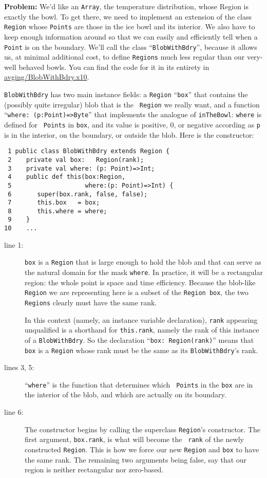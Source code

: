 {\bf Problem:} We'd like an {\tt Array}, the temperature distribution,
whose Region is exactly the bowl.  To get there, we need to implement an
extension of the class {\tt Region} whose {\tt Points} are those in the ice
bowl and its interior. We also have to keep enough information around
so that we can easily and
efficiently tell when a {\tt Point} is on the boundary. We'll call the class
``{\tt BlobWithBdry}'', because it allows us, at minimal additional cost, to
define {\tt Regions} much less regular than our very-well behaved bowls. You
can find the code for it in its entirety in
 \href{http://dist.codehaus.org/x10/documentation/guide/src/avging/BlobWithBdry.x10}
{avging/BlobWithBdry.x10}.
  

{\tt BlobWithBdry} has two main instance fields: a {\tt Region}
``{\tt box}'' that contains the (possibly quite irregular) blob that is the {\tt
Region} we really want, and a function ``{\tt where: (p:Point)=>Byte}'' that
implements the analogue of {\tt inTheBowl}: {\tt where} is defined for {\tt
Points} in {\tt box}, and its value is positive, 0, or
negative according as {\tt p} is in the interior, on the boundary, or outside
the blob.  Here is the constructor:

\begin{verbatim}
 1 public class BlobWithBdry extends Region {
 2    private val box:   Region(rank);
 3    private val where: (p: Point)=>Int;
 4    public def this(box:Region, 
 5                    where:(p: Point)=>Int) {
 6       super(box.rank, false, false);
 7       this.box   = box;
 8       this.where = where;
 9    }
10    ...
\end{verbatim}
\begin{description}
\item[line 1:]  {\tt box} is a {\tt Region} that is large enough to hold the
blob and that can serve as the natural domain for the mask {\tt where}.
In practice, it will be a rectangular region: the whole point is space 
and time efficiency.  Because the blob-like {\tt Region} we are representing
here is a subset of the {\tt Region box}, the two {\tt Regions} clearly must
have the same rank.

In this context (namely, an instance variable declaration), {\tt rank}
appearing unqualified is a shorthand for
{\tt this.rank}, namely the rank of this instance of a {\tt BlobWithBdry}.  So
the declaration ``{\tt box: Region(rank)}'' means that {\tt box} is a {\tt Region}
whose rank must be the same as its {\tt BlobWithBdry}'s rank.

\item[lines 3, 5:] ``{\tt where}'' is the function that determines which {\tt
Points} in the {\tt box} are in the interior of the blob,
 and which are actually on its boundary.
\item[line 6:] The constructor begins by calling the superclass {\tt Region}'s
constructor.  The first argument, {\tt box.rank}, is what will become the {\tt
rank} of the newly constructed {\tt Region}.  This is how we force our new
{\tt Region} and {\tt box} to have the same rank.  The remaining two
arguments being false, say that our region is neither rectangular nor
zero-based.
\end{description}

